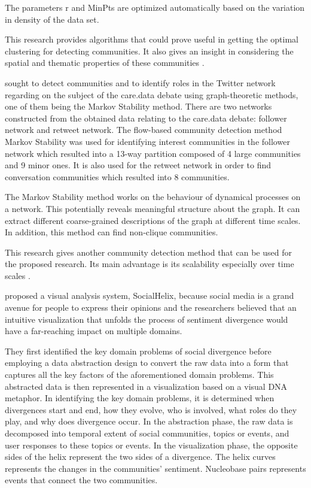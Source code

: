 The parameters r and MinPts are optimized automatically based on the variation in density of the data set.

This research provides algorithms that could prove useful in getting the optimal clustering for detecting communities. It also gives an insight in considering the spatial and thematic properties of these communities \cite{Bakillah:2014}.

 sought to detect communities and to identify roles in the Twitter network regarding on the subject of the care.data debate using graph-theoretic methods, one of them being the Markov Stability method. There are two networks constructed from the obtained data relating to the care.data debate: follower network and retweet network. The flow-based community detection method Markov Stability was used for identifying interest communities in the follower network which resulted into a 13-way partition composed of 4 large communities and 9 minor ones. It is also used for the retweet network in order to find conversation communities which resulted into 8 communities. 

The Markov Stability method works on the behaviour of dynamical processes on a network. This potentially reveals meaningful structure about the graph. It can extract different coarse-grained descriptions of the graph at different time scales. In addition, this method can find non-clique communities.

This research gives another community detection method that can be used for the proposed research. Its main advantage is its scalability especially over time scales \cite{Amor:2015}.

 proposed a visual analysis system, SocialHelix, because social media is a grand avenue for people to express their opinions and the researchers believed that an intuitive visualization that unfolds the process of sentiment divergence would have a far-reaching impact on multiple domains. 

They first identified the key domain problems of social divergence before employing a data abstraction design to convert the raw data into a form that captures all the key factors of the aforementioned domain problems. This abstracted data is then represented in a visualization based on a visual DNA metaphor. In identifying the key domain problems, it is determined when divergences start and end, how they evolve, who is involved, what roles do they play, and why does divergence occur. In the abstraction phase, the raw data is decomposed into temporal extent of social communities, topics or events, and user responses to these topics or events. In the visualization phase, the opposite sides of the helix represent the two sides of a divergence. The helix curves represents the changes in the communities’ sentiment. Nucleobase pairs represents events that connect the two communities. 

